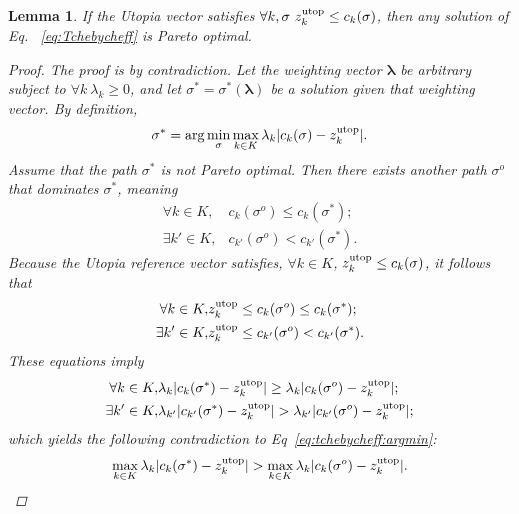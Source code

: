 \documentclass{article}
\newtheorem{lem}{Lemma}
\begin{document}
\begin{lem}
\label{lem:sol_pareto_opt}
If the Utopia vector satisfies $\forall k,\sigma\  z_k^{\rm utop}\leq c_{k}( \sigma)$, then any solution of Eq.~ \eqref{eq:Tchebycheff} is Pareto optimal.
\begin{proof}
The proof is by contradiction.  
Let the weighting vector ${\mathbf \lambda}$ be arbitrary subject to $\forall k\ \lambda_k\geq 0$, and let $ \sigma^*=\sigma^{*}({\mathbf \lambda}) $ be a solution given that weighting vector. 
By definition, 
\begin{equation}
\label{eq:tchebycheff:argmin}
\sigma^{*} = \arg \min_{ \sigma } \max_{ k \in K }  \lambda_{k} | c_{k}( \sigma ) - z^{\rm utop}_{k} | .
\end{equation}
Assume that the path $ \sigma^{*} $ is not Pareto optimal.
Then there exists another path $ \sigma^{o} $ that dominates $ \sigma^{*} $, meaning
\begin{eqnarray}
\nonumber
\forall k \in K , & c_{k}( \sigma^{o} ) \leq c_{k}( \sigma^{*} ); \\
\nonumber
\exists k' \in K , & c_{k'}( \sigma^{o} ) < c_{k'}( \sigma^{*} ).
\end{eqnarray}
Because the Utopia reference vector satisfies,  $ \forall k \in K $, $ z^{\rm utop}_{k} \leq  c_{k}( \sigma ) $, it follows that
\begin{eqnarray}
\nonumber
\forall k \in K , & z^{\rm utop}_{k} \leq c_{k}( \sigma^{o} ) \leq c_{k}( \sigma^{*} ) ; \\
\nonumber
\exists k' \in K , & z^{\rm utop}_{k} \leq c_{k'}( \sigma^{o} ) < c_{k'}( \sigma^{*} ).
\end{eqnarray}
These equations imply
\begin{eqnarray}
\nonumber
\forall k \in K , & \lambda_{k} | c_{k}( \sigma^{*} ) - z^{\rm utop}_{k} | \geq \lambda_{k}  | c_{k}( \sigma^{o} ) - z^{\rm utop}_{k} | ; \\
\nonumber
\exists k' \in K , & \lambda_{k'}  | c_{k'}( \sigma^{*} ) - z^{\rm utop}_{k} | > \lambda_{k'}  | c_{k'}( \sigma^{o} ) - z^{\rm utop}_{k} | ;
\end{eqnarray}
which yields the following contradiction to Eq~\eqref{eq:tchebycheff:argmin}:
\begin{equation}
\nonumber
\max_{ k \in K }  \lambda_{k} | c_{k}( \sigma^{*} ) - z^{\rm utop}_{k} | > \max_{ k \in K } \lambda_{k}  | c_{k}( \sigma^{o} ) - z^{\rm utop}_{k} |.
\end{equation}
\end{proof}
\end{lem}
\end{document}
